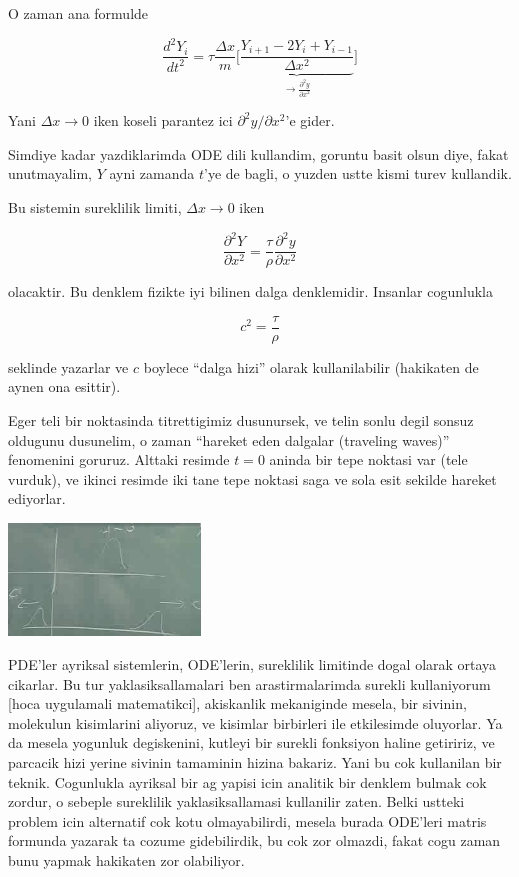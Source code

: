 \documentclass[12pt,fleqn]{article}
\begin{document}
O zaman ana formulde

\[ \frac{d^2Y_i}{dt^2} = 
\tau \frac{\Delta x}{m} \bigg[\underbrace{
\frac{Y_{i+1} - 2Y_i + Y_{i-1}}{\Delta x^2}
}_{\to \frac{\partial ^2y}{\partial x^2}}
\bigg]
\]

Yani $\Delta x \to 0$ iken koseli parantez ici $\partial ^2y/\partial
x^2$'e gider.

Simdiye kadar yazdiklarimda ODE dili kullandim, goruntu basit olsun diye,
fakat unutmayalim, $Y$ ayni zamanda $t$'ye de bagli, o yuzden ustte kismi
turev kullandik. 

Bu sistemin sureklilik limiti, $\Delta x \to 0$ iken

\[ 
\frac{\partial ^2Y}{\partial x^2} = 
\frac{\tau}{\rho}\frac{\partial ^2y}{\partial x^2}
 \]

olacaktir. Bu denklem fizikte iyi bilinen dalga denklemidir. Insanlar
cogunlukla 

\[ c^2 = \frac{\tau}{\rho} \]

seklinde yazarlar ve $c$ boylece ``dalga hizi'' olarak kullanilabilir
(hakikaten de aynen ona esittir). 

Eger teli bir noktasinda titrettigimiz dusunursek, ve telin sonlu degil
sonsuz oldugunu dusunelim, o zaman ``hareket eden dalgalar (traveling
waves)'' fenomenini goruruz. Alttaki resimde $t=0$ aninda bir tepe noktasi
var (tele vurduk), ve ikinci resimde iki tane tepe noktasi saga ve sola
esit sekilde hareket ediyorlar. 

\includegraphics[height=3cm]{1_10.png}

PDE'ler ayriksal sistemlerin, ODE'lerin, sureklilik limitinde dogal olarak
ortaya cikarlar. Bu tur yaklasiksallamalari ben arastirmalarimda surekli
kullaniyorum [hoca uygulamali matematikci], akiskanlik mekaniginde mesela,
bir sivinin, molekulun kisimlarini aliyoruz, ve kisimlar birbirleri ile
etkilesimde oluyorlar. Ya da mesela yogunluk degiskenini, kutleyi bir
surekli fonksiyon haline getiririz, ve parcacik hizi yerine sivinin
tamaminin hizina bakariz. Yani bu cok kullanilan bir teknik. Cogunlukla
ayriksal bir ag yapisi icin analitik bir denklem bulmak cok zordur, o
sebeple sureklilik yaklasiksallamasi kullanilir zaten. Belki ustteki
problem icin alternatif cok kotu olmayabilirdi, mesela burada ODE'leri
matris formunda yazarak ta cozume gidebilirdik, bu cok zor olmazdi, fakat
cogu zaman bunu yapmak hakikaten zor olabiliyor.
\end{document}
